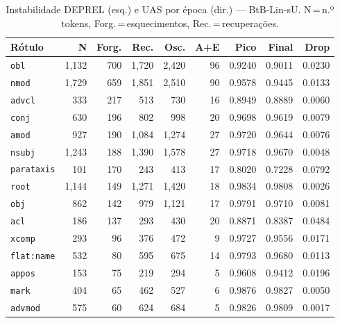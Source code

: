 

\begin{table}[ht]
\centering
\caption{Instabilidade DEPREL (esq.) e UAS por época (dir.) --- BtB-Lin-sU. N\,=\,n.º tokens, Forg.\,=\,esquecimentos, Rec.\,=\,recuperações.}
\label{tab:inst-bert-base-portuguese-cased-predictions-ablacao-linear}
\begin{minipage}[t]{0.54\linewidth}
\centering\tiny
\begin{tabular}{lrrrrrrrr}
\toprule
\textbf{Rótulo} & \textbf{N} & \textbf{Forg.} & \textbf{Rec.} & \textbf{Osc.} & \textbf{A+E} & \textbf{Pico} & \textbf{Final} & \textbf{Drop} \\
\midrule
\texttt{obl} & 1,132 & 700 & 1,720 & 2,420 & 96 & 0.9240 & 0.9011 & 0.0230 \\
\texttt{nmod} & 1,729 & 659 & 1,851 & 2,510 & 90 & 0.9578 & 0.9445 & 0.0133 \\
\texttt{advcl} & 333 & 217 & 513 & 730 & 16 & 0.8949 & 0.8889 & 0.0060 \\
\texttt{conj} & 630 & 196 & 802 & 998 & 20 & 0.9698 & 0.9619 & 0.0079 \\
\texttt{amod} & 927 & 190 & 1,084 & 1,274 & 27 & 0.9720 & 0.9644 & 0.0076 \\
\texttt{nsubj} & 1,243 & 188 & 1,390 & 1,578 & 27 & 0.9718 & 0.9670 & 0.0048 \\
\texttt{parataxis} & 101 & 170 & 243 & 413 & 17 & 0.8020 & 0.7228 & 0.0792 \\
\texttt{root} & 1,144 & 149 & 1,271 & 1,420 & 18 & 0.9834 & 0.9808 & 0.0026 \\
\texttt{obj} & 862 & 142 & 979 & 1,121 & 17 & 0.9791 & 0.9710 & 0.0081 \\
\texttt{acl} & 186 & 137 & 293 & 430 & 20 & 0.8871 & 0.8387 & 0.0484 \\
\texttt{xcomp} & 293 & 96 & 376 & 472 & 9 & 0.9727 & 0.9556 & 0.0171 \\
\texttt{flat\!:\!name} & 532 & 80 & 595 & 675 & 14 & 0.9793 & 0.9680 & 0.0113 \\
\texttt{appos} & 153 & 75 & 219 & 294 & 5 & 0.9608 & 0.9412 & 0.0196 \\
\texttt{mark} & 404 & 65 & 462 & 527 & 6 & 0.9876 & 0.9827 & 0.0050 \\
\texttt{advmod} & 575 & 60 & 624 & 684 & 5 & 0.9826 & 0.9809 & 0.0017 \\
\bottomrule
\end{tabular}
\end{minipage}
\hfill
\begin{minipage}[t]{0.42\linewidth}

\end{minipage}
\end{table}
